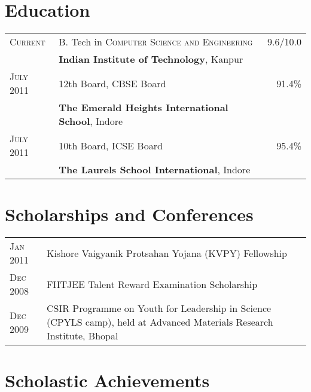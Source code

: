 \documentclass[a4paper,10pt]{article} %
\newcommand{\itemlist}[1]{
    \begin{tabular}{>{\raggedleft}p{2.2cm}p{17cm}}
        #1
    \end{tabular}
}
\begin{document}
\section{Education}

\begin{tabular}{>{\raggedleft}p{2.2cm}p{14cm}r}

    \textsc{Current} & B. Tech in \textsc{Computer Science and Engineering} &   9.6/10.0\\
                     & \textbf{Indian Institute of Technology}, Kanpur\\

    \textsc{July 2011} & 12th Board, \textsc{CBSE} Board                    &   91.4\% \\
                       & \normalsize\textbf{The Emerald Heights International School}, Indore\\

    \textsc{July 2011} & 10th Board, \textsc{ICSE} Board                    &   95.4\% \\
                       & \normalsize\textbf{The Laurels School International}, Indore \\

\end{tabular}

\section{Scholarships and Conferences}


\itemlist {
    \textsc{Jan 2011} & Kishore Vaigyanik Protsahan Yojana (KVPY) Fellowship \\
    \textsc{Dec 2008} & FIITJEE Talent Reward Examination Scholarship \\
    \textsc{Dec 2009} & CSIR Programme on Youth for Leadership in Science (CPYLS camp),
                        held at Advanced Materials Research Institute, Bhopal\\
}


\section{Scholastic Achievements}
\end{document}
